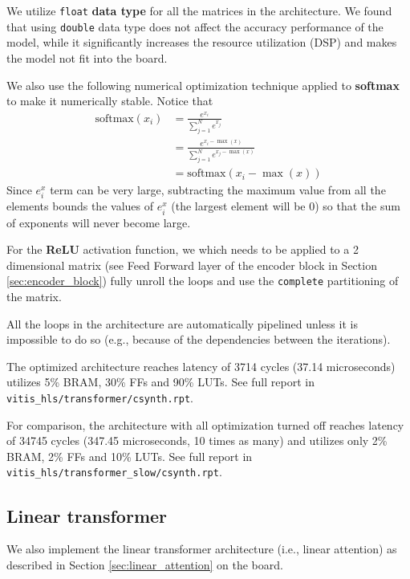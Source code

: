 \documentclass[a4paper, twoside]{report}
\theoremstyle{definition}
\numberwithin{equation}{section}
\begin{document}
We utilize \texttt{float} \textbf{data type} for all the matrices in the architecture.
We found that using \texttt{double} data type does not affect the accuracy performance
of the model, while it significantly increases the resource utilization (DSP)
and makes the model not fit into the board.

We also use the following numerical optimization technique applied to \textbf{softmax}
to make it numerically stable.
Notice that
\begin{align*}
    \text{softmax}(x_i) & = \frac{e^{x_i}}{\sum_{j=1}^{N} e^{x_j}}                     \\
                        & = \frac{e^{x_i - \max(x)}}{\sum_{j=1}^{N} e^{x_j - \max(x)}} \\
                        & = \text{softmax}(x_i - \max(x))
\end{align*}
Since $e^x_i$ term can be very large, subtracting the maximum value from all the elements
bounds the values of $e^x_i$ (the largest element will be 0) so that the
sum of exponents will never become large.

For the \textbf{ReLU} activation function, we which needs to be applied to
a 2 dimensional matrix (see Feed Forward layer of the encoder block in Section \ref{sec:encoder_block})
fully unroll the loops and use the \texttt{complete} partitioning of the matrix.

All the loops in the architecture are automatically pipelined unless
it is impossible to do so (e.g., because of the dependencies between the iterations).


The optimized architecture reaches latency of 3714 cycles (37.14 microseconds) utilizes 5\% BRAM, 30\% FFs and 90\% LUTs.
\newline
See full report in \texttt{vitis\_hls/transformer/csynth.rpt}.

For comparison, the architecture with all optimization turned off
reaches latency of 34745 cycles (347.45 microseconds, 10 times as many) and utilizes only 2\% BRAM, 2\% FFs and 10\% LUTs.
\newline
See full report in \texttt{vitis\_hls/transformer\_slow/csynth.rpt}.

\subsection{Linear transformer}

We also implement the linear transformer architecture (i.e., linear attention)
as described in Section \ref{sec:linear_attention}
on the board.
\end{document}
